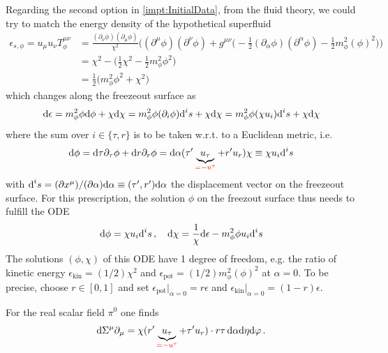 Regarding the second option in \ref{impt:InitialData}, from the fluid theory, we could try to match the energy density of the hypothetical superfluid
\begin{subequations}
    \begin{align}
        \epsilon_{s,\phi}=u_\mu u_\nu T^{\mu\nu}_{\phi}&=\frac{(\partial_\nu\phi)(\partial_\mu\phi)}{\chi^2}\Big((\partial^\mu\phi)(\partial^\nu\phi)+g^{\mu\nu}\big(-\frac{1}{2}(\partial_\alpha\phi)(\partial^\alpha\phi)-\frac{1}{2}m_\phi^2(\phi)^2\big)\Big)   \\
        &=\chi^2-\big(\frac{1}{2}\chi^2-\frac{1}{2}m_\phi^2\phi^2\big)  \\
        &=\frac{1}{2}\big(m_\phi^2\phi^2+\chi^2\big)
    \end{align}
\end{subequations}
which changes along the freezeout surface as
    \begin{equation}
        \text{d}\epsilon=m_\phi^2\phi\text{d}\phi+\chi\text{d}\chi=m_\phi^2\phi(\partial_i\phi)\text{d}^i s+\chi\text{d}\chi=m_\phi^2\phi(\chi u_i)\text{d}^i s+\chi\text{d}\chi
    \end{equation}
where the sum over $i\in\{\tau,r\}$ is to be taken w.r.t. to a Euclidean metric, i.e.
\begin{equation}
    \text{d}\phi=\text{d}\tau\partial_\tau\phi+\text{d} r\partial_r\phi=\text{d}\alpha(\tau^\prime \underbrace{u_\tau}_{\textcolor{red}{=-u^\tau}}+r^\prime u_r)\chi\equiv\chi u_i\text{d}^is
\end{equation}
with $\text{d}^i s=(\partial x^\mu)/(\partial\alpha)\text{d}\alpha\equiv(\tau^\prime,r^\prime)\text{d}\alpha$ the displacement vector on the freezeout surface. For this prescription, the solution $\phi$ on the freezout surface thus needs to fulfill the ODE
\begin{equation}
    \text{d}\phi=\chi u_i\text{d}^i s\,,\quad
    \text{d}\chi=\frac{1}{\chi}\text{d}\epsilon-m_\phi^2\phi u_i\text{d}^i s
\end{equation}
The solutions $(\phi,\chi)$ of this ODE have 1 degree of freedom, e.g. the ratio of kinetic energy $\epsilon_{\text{kin}}=(1/2)\chi^2$ and $\epsilon_{\text{pot}}=(1/2)m_\phi^2(\phi)^2$ at $\alpha=0$. To be precise, choose $r\in[0,1]$ and set $\epsilon_{\text{pot}}\big\vert_{\alpha=0}=r\epsilon$ and $\epsilon_{\text{kin}}\big\vert_{\alpha=0}=(1-r)\epsilon$.

For the real scalar field $\pi^0$ one finds
\begin{equation}
    \text{d}\Sigma^\mu\partial_\mu=\chi(r^\prime \underbrace{u_\tau}_{\textcolor{red}{=-u^\tau}}+\tau^\prime u_r)\cdot r\tau\,\text{d}\alpha\text{d}\eta\text{d}\varphi\,.
\end{equation}

